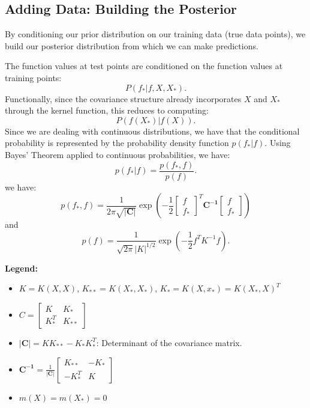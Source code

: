 \documentclass{article}
\begin{document}
\subsection{Adding Data: Building the Posterior}

By conditioning our prior distribution on our training data (true data points), we build our posterior distribution from which we can make predictions. 

\noindent
The function values at test points are conditioned on the function values at training points:
\[
P(f_* | f, X, X_*).
\]
\noindent
Functionally, since the covariance structure already incorporates $X$ and $X_*$ through the kernel function, this reduces to computing:
\[
P(f(X_*) | f(X)).
\]
\noindent
Since we are dealing with continuous distributions, we have that the conditional probability is represented by the probability density function
$
p(f_* | f).
$
Using Bayes' Theorem applied to continuous probabilities, we have:
\[
p(f_* | f) = \frac{p(f_*, f)}{p(f)}.
\]
we have:
$$p(f_*,f) = \frac{1}{2\pi\sqrt{\mathbf{|C|}}}\exp \left(-\frac{1}{2} 
\begin{bmatrix} f \\ f_*  \end{bmatrix}^T\mathbf{C^{-1}}\begin{bmatrix} f  \\ f_* \end{bmatrix}\right)$$
and 
\[
p(f) = \frac{1}{\sqrt{2\pi} |K|^{1/2}}
\exp \left(-\frac{1}{2} f^T K^{-1} f \right).
\]

\noindent
\textbf{Legend:}
\begin{itemize}
    \item $K = K(X, X)$, $K_{**} = K(X_*,X_*)$, $K_* = K(X,x_*) = K(X_*,X)^T$
    \item $C = \begin{bmatrix}
K & K_* \\
K_*^T & K_{**}
\end{bmatrix}$
    \item $|\mathbf{C}| = K K_{**} - K_* K_*^T$: Determinant of the covariance matrix.
    \item $\mathbf{C^{-1}} = \frac{1}{|\mathbf{C}|} 
    \begin{bmatrix}
    K_{**} & -K_* \\ -K_*^T & K
    \end{bmatrix}$
    \item $m(X) = m(X_*) = 0$
\end{itemize}

\noindent
\end{document}
